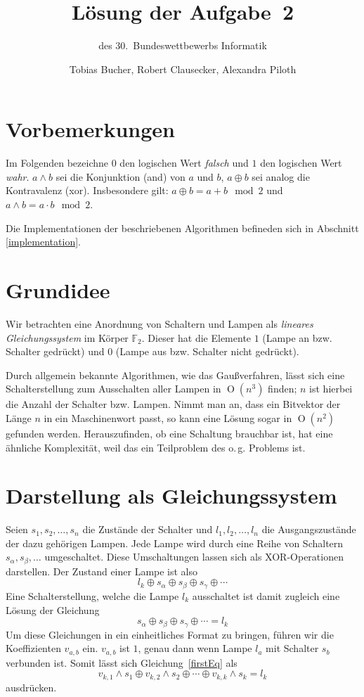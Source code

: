 \documentclass{scrartcl}
\title{Lösung der Aufgabe~2}
\subtitle{des 30.~Bundeswettbewerbs Informatik}
\author{Tobias Bucher, Robert Clausecker, Alexandra Piloth}
\newcommand{\ftwo}{\ensuremath{\mathbb F_2}}
\DeclareMathOperator{\bigO}{O}
\newcommand{\xor}{\oplus}
\begin{document}
\maketitle

\section*{Vorbemerkungen}
Im Folgenden bezeichne $0$ den logischen Wert \emph{falsch} und $1$ den
logischen Wert \emph{wahr}. $a\land b$ sei die Konjunktion (and) von $a$
und $b$, $a\xor b$ sei analog die Kontravalenz (xor). Insbesondere gilt:
$a\xor b=a+b\mod 2$ und $a\land b=a\cdot b\mod 2$.

Die Implementationen der beschriebenen Algorithmen befineden sich in Abschnitt
\ref{implementation}.

\section{Grundidee}
Wir betrachten eine Anordnung von Schaltern und Lampen als \emph{lineares
Gleichungssystem} im Körper \ftwo.  Dieser hat die Elemente $1$ (Lampe an bzw.
Schalter gedrückt) und $0$ (Lampe aus bzw. Schalter nicht gedrückt).

Durch allgemein bekannte Algorithmen, wie das Gaußverfahren, lässt sich eine
Schalterstellung zum Ausschalten aller Lampen in $\bigO(n^3)$ finden; $n$ ist
hierbei die Anzahl der Schalter bzw. Lampen. Nimmt man an, dass ein Bitvektor
der Länge $n$ in ein Maschinenwort passt, so kann eine Lösung sogar in $\bigO(
n^2)$ gefunden werden. Herauszufinden, ob eine Schaltung brauchbar ist, hat eine
ähnliche Komplexität, weil das ein Teilproblem des o.\,g. Problems ist.

\section{Darstellung als Gleichungssystem}
Seien $s_1, s_2,\dots, s_n$ die Zustände der Schalter und $l_1, l_2,\dots,l_n$
die Ausgangszustände der dazu gehörigen Lampen. Jede Lampe wird durch eine Reihe
von Schaltern $s_\alpha, s_\beta,\dots$ umgeschaltet. Diese Umschaltungen lassen
sich als XOR-Operationen darstellen. Der Zustand einer Lampe ist also
\begin{equation}
l_k \xor s_\alpha \xor s_\beta \xor s_\gamma \xor \cdots
\end{equation}
Eine Schalterstellung, welche die Lampe $l_k$ ausschaltet ist damit zugleich
eine Lösung der Gleichung
\begin{equation}
s_\alpha \xor s_\beta \xor s_\gamma \xor \cdots = l_k\label{firstEq}
\end{equation}
Um diese Gleichungen in ein einheitliches Format zu bringen, führen
wir die Koeffizienten $v_{a,b}$ ein. $v_{a,b}$ ist $1$, genau dann wenn Lampe
$l_a$ mit Schalter $s_b$ verbunden ist. Somit lässt sich Gleichung~\ref{firstEq}
als
\begin{equation}
v_{k,1}\land s_1\xor v_{k,2}\land s_2\xor\cdots\xor v_{k,k}\land s_k=l_k
\end{equation}
ausdrücken.
\end{document}
